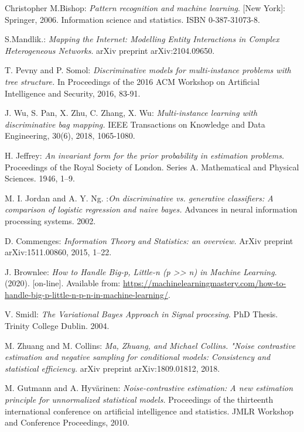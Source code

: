 \begin{thebibliography}{1}

Christopher M.Bishop: \emph{Pattern recognition and machine learning}. [New York]: Springer, 2006. Information science and statistics. ISBN 0-387-31073-8.

S.Mandlik.: \emph{Mapping the Internet: Modelling Entity
	Interactions in Complex Heterogeneous Networks}. arXiv preprint arXiv:2104.09650.

T. Pevny and P. Somol: 	\emph{Discriminative models for multi-instance problems with tree structure.} In Proceedings of the 2016 ACM Workshop on Artificial Intelligence and Security, 2016, 83-91.

J. Wu, S. Pan, X. Zhu, C. Zhang, X. Wu: \emph{Multi-instance learning with discriminative bag mapping.} IEEE Transactions on Knowledge and Data Engineering, 30(6), 2018, 1065-1080.

H. Jeffrey: \emph{An invariant form for the prior probability in estimation problems.} Proceedings of the Royal Society of London. Series A. Mathematical and Physical Sciences. 1946, 1--9.

 M. I. Jordan and A. Y. Ng. :\emph{On discriminative vs. generative classifiers: A comparison of logistic regression and naive bayes.} Advances in neural information processing systems.  2002.

D. Commenges: \emph{Information Theory and Statistics: an overview.} ArXiv preprint arXiv:1511.00860, 2015,  1--22.

J. Brownlee: \emph{How to Handle Big-p, Little-n (p >> n) in Machine Learning}. (2020). [on-line]. Available from: \url{https://machinelearningmastery.com/how-to-handle-big-p-little-n-p-n-in-machine-learning/}.

 V. Smidl: \emph{The Variational Bayes Approach in Signal procesing}. PhD Thesis. Trinity College Dublin. 2004.

 M. Zhuang and M. Collins: \emph{Ma, Zhuang, and Michael Collins. "Noise contrastive estimation and negative sampling for conditional models: Consistency and statistical efficiency.} arXiv preprint arXiv:1809.01812, 2018.

 M. Gutmann and A. Hyvärinen: \emph{Noise-contrastive estimation: A new estimation principle for unnormalized statistical models.}  Proceedings of the thirteenth international conference on artificial intelligence and statistics. JMLR Workshop and Conference Proceedings, 2010.


\end{thebibliography}
